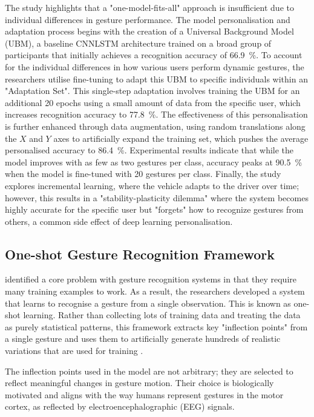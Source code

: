 The study highlights that a "one-model-fits-all" approach is insufficient due to individual differences in gesture performance. The model personalisation and adaptation process begins with the creation of a Universal Background Model (UBM), a baseline CNNLSTM architecture trained on a broad group of participants that initially achieves a recognition accuracy of 66.9~\%. To account for the individual differences in how various users perform dynamic gestures, the researchers utilise fine-tuning to adapt this UBM to specific individuals within an "Adaptation Set". This single-step adaptation involves training the UBM for an additional 20 epochs using a small amount of data from the specific user, which increases recognition accuracy to 77.8~\%. The effectiveness of this personalisation is further enhanced through data augmentation, using random translations along the $X$ and $Y$ axes to artificially expand the training set, which pushes the average personalised accuracy to 86.4~\%. Experimental results indicate that while the model improves with as few as two gestures per class, accuracy peaks at 90.5~\% when the model is fine-tuned with 20 gestures per class. Finally, the study explores incremental learning, where the vehicle adapts to the driver over time; however, this results in a "stability-plasticity dilemma" where the system becomes highly accurate for the specific user but "forgets" how to recognize gestures from others, a common side effect of deep learning personalisation.

\subsection{One-shot Gesture Recognition Framework}
\cite{Cabrera2017} identified a core problem with gesture recognition systems in that they require many training examples to work. As a result, the researchers developed a system that learns to recognise a gesture from a single observation. This is known as one-shot learning. Rather than collecting lots of training data and treating the data as purely statistical patterns, this framework extracts key "inflection points" from a single gesture and uses them to artificially generate hundreds of realistic variations that are used for training \citep{Cabrera2017}. 

The inflection points used in the model are not arbitrary; they are selected to reflect meaningful changes in gesture motion. Their choice is biologically motivated and aligns with the way humans represent gestures in the motor cortex, as reflected by electroencephalographic (EEG) signals.

